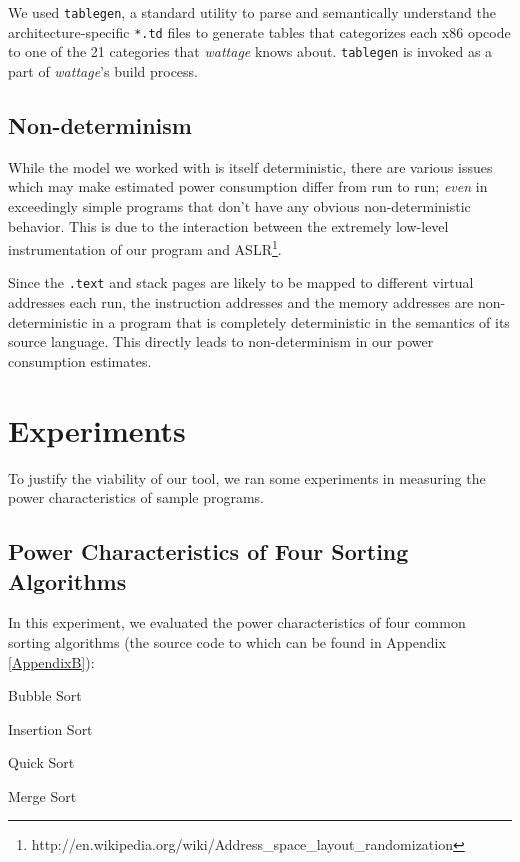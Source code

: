 We used \texttt{tablegen}, a standard utility to parse and
semantically understand the architecture-specific \texttt{*.td} files
to generate tables that categorizes each x86 opcode to one of the 21
categories that \textit{wattage} knows about.  \texttt{tablegen} is
invoked as a part of \textit{wattage}'s build process.

\subsection{Non-determinism}

While the model we worked with is itself deterministic, there are
various issues which may make estimated power consumption differ from
run to run; \textit{even} in exceedingly simple programs that don't
have any obvious non-deterministic behavior.  This is due to the
interaction between the extremely low-level instrumentation of our
program and
ASLR\footnote{http://en.wikipedia.org/wiki/Address\_space\_layout\_randomization}.

Since the \texttt{.text} and stack pages are likely to be mapped to
different virtual addresses each run, the instruction addresses and
the memory addresses are non-deterministic in a program that is
completely deterministic in the semantics of its source language.
This directly leads to non-determinism in our power consumption
estimates.

\section{Experiments}

To justify the viability of our tool, we ran some experiments in
measuring the power characteristics of sample programs.

\subsection{Power Characteristics of Four Sorting Algorithms}

In this experiment, we evaluated the power characteristics of four
common sorting algorithms (the source code to which can be found in
Appendix \ref{AppendixB}):

\begin{enumerate*}
\item Bubble Sort
\item Insertion Sort
\item Quick Sort
\item Merge Sort
\end{enumerate*}

